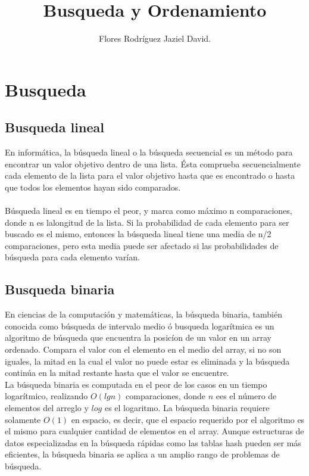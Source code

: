 \documentclass{article}
\title{Busqueda y Ordenamiento}
\author{Flores Rodr\'{i}guez Jaziel David.}
\begin{document}
\maketitle

\section*{Busqueda}
\subsection*{Busqueda lineal}

En inform\'atica, la b\'usqueda lineal o la b\'usqueda secuencial es un m\'etodo para encontrar un valor objetivo dentro de una lista. \'Esta comprueba secuencialmente cada elemento de la lista para el valor objetivo hasta que es encontrado o hasta que todos los elementos hayan sido comparados.\\
\\
B\'usqueda lineal es en tiempo el peor, y marca como m\'aximo n comparaciones, donde n es
lalongitud de la lista. Si la probabilidad de cada elemento para ser buscado es el mismo,
entonces la b\'usqueda lineal tiene una media de n/2 comparaciones, pero esta media puede
ser afectado si las probabilidades de b\'usqueda para cada elemento var\'ian.

\subsection*{Busqueda binaria}

En ciencias de la computaci\'on y matem\'aticas, la b\'usqueda binaria, tambi\'en conocida
como b\'usqueda de intervalo medio \'o busqueda logar\'itmica es un algoritmo de
b\'usqueda que encuentra la posic\'ion de un valor en un array ordenado. Compara el valor
con el elemento en el medio del array, si no son iguales, la mitad en la cual el valor no
puede estar es eliminada y la búsqueda contin\'ua en la mitad restante hasta que el valor
se encuentre.\\
La b\'usqueda binaria es computada en el peor de los casos en un tiempo logar\'itmico, realizando $O(lg n)$ comparaciones, donde $n$ ees el n\'umero de elementos del arreglo y
$log$ es el logaritmo. La b\'usqueda binaria requiere solamente
$O(1)$ en espacio, es decir, que el espacio requerido por el algoritmo es el mismo para
cualquier cantidad de elementos en el array. Aunque estructuras de datos especializadas en
la b\'usqueda r\'apidas como las tablas hash pueden ser m\'as eficientes, la b\'usqueda
binaria se aplica a un amplio rango de problemas de b\'usqueda.\\
\end{document}
